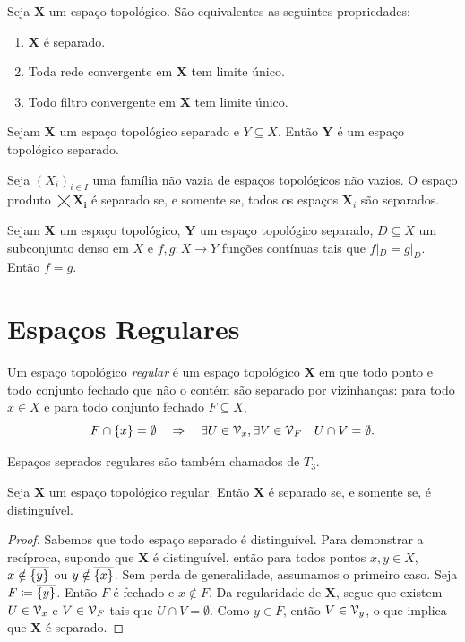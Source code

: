 \begin{prop}
	Seja $\bm X$ um espaço topológico. São equivalentes as seguintes propriedades:
	\begin{enumerate}
	\item $\bm X$ é separado.
	\item Toda rede convergente em $\bm X$ tem limite único.
	\item Todo filtro convergente em $\bm X$ tem limite único.
	\end{enumerate}
\end{prop}

\begin{prop}
	Sejam $\bm X$ um espaço topológico separado e $Y \subseteq X$. Então $\bm Y$ é um espaço topológico separado.
\end{prop}

\begin{prop}
	Seja $(X_i)_{i \in I}$ uma família não vazia de espaços topológicos não vazios. O espaço produto $\bm{\bigtimes X_i}$ é separado se, e somente se, todos os espaços $\bm X_i$ são separados.
\end{prop}

\begin{prop}
	Sejam $\bm X$ um espaço topológico, $\bm Y$ um espaço topológico separado, $D \subseteq X$ um subconjunto denso em $X$ e $f,g: X \to Y$ funções contínuas tais que $f|_D=g|_D$. Então $f=g$.
\end{prop}

\section{Espaços Regulares}

\begin{defi}
	Um espaço topológico \emph{regular} é um espaço topológico $\bm X$ em que todo ponto e todo conjunto fechado que não o contém são separado por vizinhanças: para todo $x \in X$ e para todo conjunto fechado $F \subseteq X$,
	\begin{equation*}
	F \cap \{x\}=\emptyset \quad \Rightarrow \quad \exists U \in \mathcal{V}_x, \exists V \in \mathcal{V}_F \quad U \cap V = \emptyset.
	\end{equation*}
\end{defi}

Espaços seprados regulares são também chamados de $T_3$.

\begin{prop}
	Seja $\bm X$ um espaço topológico regular. Então $\bm X$ é separado se, e somente se, é distinguível.
\end{prop}
\begin{proof}
	Sabemos que todo espaço separado é distinguível. Para demonstrar a recíproca, supondo que $\bm X$ é distinguível, então para todos pontos $x,y \in X$, $x \notin \overline{\{y\}}$ ou $y \notin \overline{\{x\}}$. Sem perda de generalidade, assumamos o primeiro caso. Seja $F \coloneqq \fec{\{y\}}$. Então $F$ é fechado e $x \notin F$. Da regularidade de $\bm X$, segue que existem $U \in \mathcal{V}_x$ e $V \in \mathcal{V}_{F}$ tais que $U \cap V = \emptyset$. Como $y \in F$, então $V \in \mathcal{V}_y$, o que implica que $\bm X$ é separado.
\end{proof}

